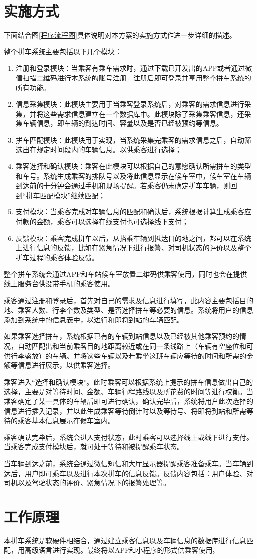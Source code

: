 \section{实施方式}
	下面结合图\ref{程序流程图}具体说明对本方案的实施方式作进一步详细的描述。
	\par\indent 整个拼车系统主要包括以下几个模块：
	\begin{enumerate}
		\item 注册和登录模块：当乘客有乘车需求时，通过下载已开发出的APP或者通过微信扫描二维码进行本系统的账号注册，注册后即可登录并享用整个拼车系统的所有功能。
		\item 信息采集模块：此模块主要用于当乘客登录系统后，对乘客的需求信息进行采集，并将这些需求信息建立在一个数据库中。此模块除了采集乘客信息，还采集车辆信息，即车辆的到达时间、容量以及是否已经被预约等信息。
		\item 拼车匹配模块：此模块用于实现，当系统采集完乘客的需求信息之后，自动筛选出在规定时间段内的车辆信息。以供乘客进行选择；
		\item 乘客选择和确认模块：乘客在此模块可以根据自己的意愿确认所需拼车的类型和车号。系统生成乘客的排队号以及将此信息显示在候车室中，候车室在车辆到达前的十分钟会通过手机和现场提醒。若乘客仍未确定拼车车辆，则回到“拼车匹配模块”继续匹配；
		\item 支付模块：当乘客完成对车辆信息的匹配和确认后，系统根据计算生成乘客应付款的金额，乘客可以选择在线支付也可选择线下支付；
		\item 反馈模块：乘客完成拼车以后，从搭乘车辆到抵达目的地之间，都可以在系统上进行信息的反馈，比如在紧急情况下进行报警、对司机状态的评价以及整个拼车过程的乘客体验反馈。
	\end{enumerate}	
	\par\indent 整个拼车系统会通过APP和车站候车室放置二维码供乘客使用，同时也会在提供线上服务台供没带手机的乘客使用。
	\par\indent 乘客通过注册和登录后，首先对自己的需求及信息进行填写，此内容主要包括目的地、乘客人数、行李个数及类型、是否选择拼车等必要的信息。系统将用户的信息添加到系统中的信息表中，以进行和即将到站的车辆匹配。
	\par\indent 如果乘客选择拼车，系统根据已有的车辆到站信息以及已经被其他乘客预约的情况，自动匹配出和当前乘客目的地距离较近或在同一条线路上（车辆有空座位和可供行李盛放）的车辆。并将这些车辆以及若乘坐这班车辆应等待的时间和所需的金额等信息进行展示，以供乘客选择。
	\par\indent 乘客进入“选择和确认模块”。此时乘客可以根据系统上提示的拼车信息做出自己的选择，主要是对等待时间、金额、车辆行程路线以及所花费的时间等进行权衡。当乘客确定了某一具体的车辆后即可进行确认，确认完毕后，系统将用户此次选择的信息进行插入记录，并以此生成乘客等待倒计时以及等待号、将即将到站和所需等待的乘客基本信息展示在候车室内。
	\par\indent 乘客确认完毕后，系统会进入支付状态，此时乘客可以选择线上或线下进行支付。当乘客完成支付模块后，就可处于等待和被提醒乘车状态。
	\par\indent 当车辆到达之前，系统会通过微信短信和大厅显示器提醒乘客准备乘车。当车辆到达后，用户即可乘车以及进行本次拼车的信息反馈。反馈内容包括：用户体验、对司机以及驾驶状态的评价、紧急情况下的报警处理等。
\section{工作原理}
	本拼车系统是软硬件相结合，通过建立乘客信息以及车辆信息的数据库进行信息匹配，用高级语言进行实现。最终将以APP和小程序的形式供乘客使用。
